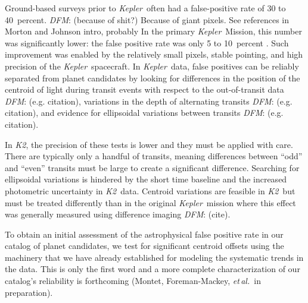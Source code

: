 \documentclass[12pt,preprint]{aastex}
\newcommand{\project}[1]{\textsl{#1}} %
\newcommand{\kepler}{\project{Kepler}}
\newcommand{\KT}{\project{K2}}
\newcommand{\foreign}[1]{\emph{#1}}
\newcommand{\etal}{\foreign{et\,al.}}
\newcommand{\todo}[3]{{\color{#2}\emph{#1}: #3}}
\newcommand{\dfmtodo}[1]{\todo{DFM}{red}{#1}}
\begin{document}
Ground-based surveys prior to \kepler\ often had a false-positive rate
of 30 to 40~percent. \dfmtodo{(because of shit?) Because of giant pixels.
See references in Morton and Johnson intro, probably}
In the primary \kepler\ Mission, this number was significantly lower:
the false positive rate was only 5 to 10~percent \citep{Morton:2011}.
Such improvement was enabled by the relatively small pixels, stable
pointing, and high precision of the \kepler\ spacecraft.
In \kepler\ data, false positives can be reliably separated from
planet candidates by looking for differences in the position of the
centroid of light during transit events with respect to the
out-of-transit data \dfmtodo{(e.g. citation)}, variations in the depth of
alternating transits \dfmtodo{(e.g. citation)}, and evidence for ellipsoidal
variations between transits \dfmtodo{(e.g. citation)}.

In \KT, the precision of these tests is lower and they must be applied with
care.
There are typically only a handful of transits, meaning differences between
``odd'' and ``even'' transits must be large to create a significant
difference.
Searching for ellipsoidal variations is hindered by the short time baseline
and the increased photometric uncertainty in \KT\ data.
Centroid variations are feasible in \KT\ but must be treated differently than
in the original \kepler\ mission where this effect was generally measured
using difference imaging \dfmtodo{(cite)}.

To obtain an initial assessment of the astrophysical false positive rate in
our catalog of planet candidates, we test for significant centroid offsets
using the machinery that we have already established for modeling the
systematic trends in the data.
This is only the first word and a more complete characterization of our
catalog's reliability is forthcoming (Montet, Foreman-Mackey, \etal\ in
preparation).
\end{document}
